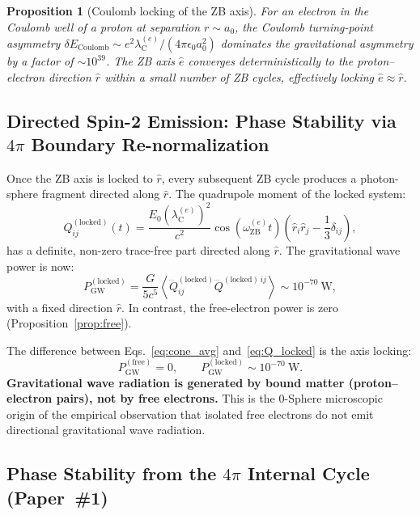 \documentclass[%
 reprint, amsmath,amssymb, aps, prd, ]{revtex4-2}
\numberwithin{equation}{section}
\newtheorem{proposition}[theorem]{Proposition}
\newcommand{\lambdaCe}{\lambda_{\mathrm{C}}^{(e)}}
\newcommand{\omZBe}{\omega_{\mathrm{ZB}}^{(e)}}
\begin{document}
\begin{proposition}[Coulomb locking of the ZB axis]
\label{prop:lock}
For an electron in the Coulomb well of a proton at separation $r \sim a_0$, the Coulomb turning-point asymmetry $\delta E_\mathrm{Coulomb} \sim e^2\lambdaCe/(4\pi\epsilon_0 a_0^2)$ dominates the gravitational asymmetry by a factor of $\sim 10^{39}$. The ZB axis $\hat{e}$ converges deterministically to the proton--electron direction $\hat{r}$ within a small number of ZB cycles, effectively locking $\hat{e} \approx \hat{r}$.
\end{proposition}

\subsection{Directed Spin-2 Emission: Phase Stability via $4\pi$ Boundary Re-normalization}

Once the ZB axis is locked to $\hat{r}$, every subsequent ZB cycle produces a photon-sphere fragment directed along $\hat{r}$.
The quadrupole moment of the locked system:
\begin{equation}
Q_{ij}^{(\text{locked})}(t)
= \frac{E_0 (\lambdaCe)^2}{c^2}
\cos(\omZBe t)
\left(\hat{r}_i\hat{r}_j - \frac{1}{3}\delta_{ij}\right),
\label{eq:Q_locked}
\end{equation}
has a definite, non-zero trace-free part directed along $\hat{r}$.
The gravitational wave power is now:
\begin{equation}
P_\mathrm{GW}^{(\text{locked})}
= \frac{G}{5c^5}
\left\langle
  \dddot{Q}_{ij}^{(\text{locked})}
  \dddot{Q}^{(\text{locked})\,ij}
\right\rangle
\sim 10^{-70}\ \text{W},
\label{eq:P_locked}
\end{equation}
with a fixed direction $\hat{r}$.
In contrast, the free-electron power is zero (Proposition~\ref{prop:free}).

The difference between Eqs.~\eqref{eq:cone_avg} and~\eqref{eq:Q_locked} is the axis locking:
\begin{equation}
P_\mathrm{GW}^{(\text{free})} = 0,
\qquad
P_\mathrm{GW}^{(\text{locked})} \sim 10^{-70}\ \text{W}.
\label{eq:power_comparison}
\end{equation}
\textbf{Gravitational wave radiation is generated by bound matter (proton--electron pairs), not by free electrons.}
This is the 0-Sphere microscopic origin of the empirical observation that isolated free electrons do not emit directional gravitational wave radiation.

\subsection{Phase Stability from the $4\pi$ Internal Cycle (Paper~\protect\#1)}
\label{subsec:4pi}
\end{document}
